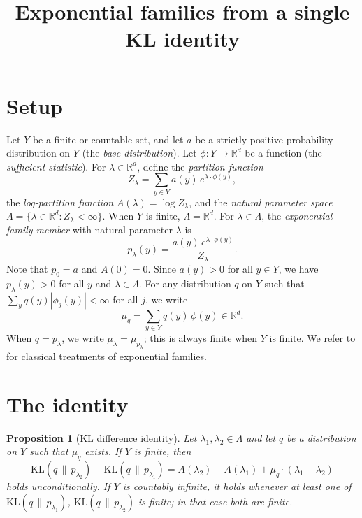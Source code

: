 \documentclass[11pt, a4paper, 
onecolumn, 
showabstract]{naverlabseurope-onecol-flex}
\title{Exponential families from a single KL identity}
\newtheorem{proposition}[theorem]{Proposition}
\theoremstyle{definition}
\theoremstyle{remark}
\newcommand{\KL}[2]{\mathrm{KL}\!\left(#1 \,\|\, #2\right)}
\newcommand{\R}{\mathbb{R}}
\begin{document}
\maketitle



\section{Setup}

Let $Y$ be a finite or countable set, and let $a$ be a strictly positive probability distribution on $Y$ (the \emph{base distribution}).
Let $\phi \colon Y \to \R^d$ be a function (the \emph{sufficient statistic}).
For $\lambda \in \R^d$, define the \emph{partition function}
\[
    Z_\lambda = \sum_{y \in Y} a(y)\, e^{\lambda \cdot \phi(y)},
\]
the \emph{log-partition function} $A(\lambda) = \log Z_\lambda$,
and the \emph{natural parameter space} $\Lambda = \{\lambda \in \R^d : Z_\lambda < \infty\}$.
When $Y$ is finite, $\Lambda = \R^d$.
For $\lambda \in \Lambda$, the \emph{exponential family member} with natural parameter $\lambda$ is
\[
    p_\lambda(y) = \frac{a(y)\,e^{\lambda \cdot \phi(y)}}{Z_\lambda}.
\]
Note that $p_0 = a$ and $A(0) = 0$.
Since $a(y) > 0$ for all $y \in Y$, we have $p_\lambda(y) > 0$ for all $y$ and $\lambda \in \Lambda$.
For any distribution $q$ on $Y$ such that $\sum_{y} q(y)|\phi_j(y)| < \infty$ for all $j$, we write
\[
    \mu_q = \sum_{y \in Y} q(y)\,\phi(y) \in \R^d.
\]
When $q = p_\lambda$, we write $\mu_\lambda = \mu_{p_\lambda}$; this is always finite when $Y$ is finite.
We refer to \cite{Brown1986,BarndorffNielsen1978,WainwrightJordan2008} for classical treatments of exponential families.

\section{The identity}\label{sec:identity}

\begin{proposition}[KL difference identity]\label{prop:identity}
Let $\lambda_1, \lambda_2 \in \Lambda$ and let $q$ be a distribution on $Y$ such that $\mu_q$ exists.
If $Y$ is finite, then
\begin{equation}\label{eq:identity}
    \boxed{\KL{q}{p_{\lambda_2}} - \KL{q}{p_{\lambda_1}}
    = A(\lambda_2) - A(\lambda_1) + \mu_q \cdot (\lambda_1 - \lambda_2)}
\end{equation}
holds unconditionally.
If $Y$ is countably infinite, it holds whenever at least one of $\KL{q}{p_{\lambda_1}}$, $\KL{q}{p_{\lambda_2}}$ is finite; in that case both are finite.
\end{proposition}
\end{document}
